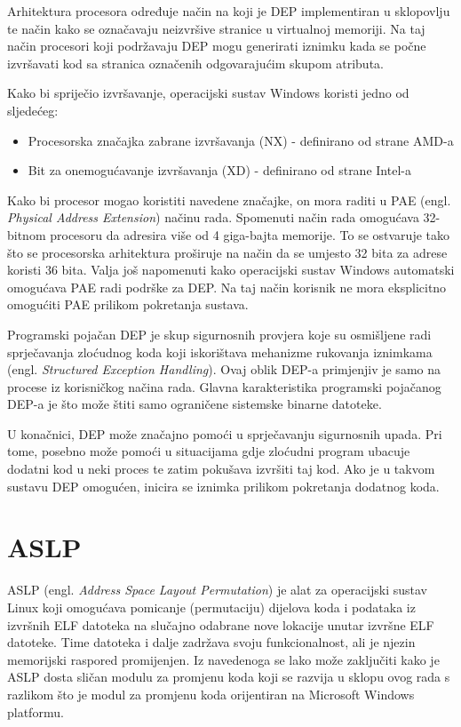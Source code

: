 \documentclass[times, utf8, diplomski, numeric]{fer}
\begin{document}
Arhitektura procesora određuje način na koji je DEP implementiran
u sklopovlju te način kako se označavaju neizvršive stranice u virtualnoj memoriji.
Na taj način procesori koji podržavaju DEP mogu generirati
iznimku kada se počne izvršavati kod sa stranica označenih
odgovarajućim skupom atributa.

Kako bi spriječio izvršavanje, operacijski sustav Windows koristi
jedno od sljedećeg:

\begin{itemize}
\item Procesorska značajka zabrane izvršavanja (NX) - definirano od strane AMD-a
\item Bit za onemogućavanje izvršavanja (XD) - definirano od strane Intel-a
\end{itemize}

Kako bi procesor mogao koristiti navedene značajke, on mora
raditi u PAE (engl. \emph{Physical Address
Extension}) \citep{pae_ms} načinu rada. Spomenuti način rada
omogućava 32-bitnom procesoru da adresira više od 4 giga-bajta
memorije. To se ostvaruje tako što se procesorska arhitektura
proširuje na način da se umjesto 32 bita za adrese koristi 36
bita. Valja još napomenuti kako operacijski sustav Windows
automatski omogućava PAE radi podrške za DEP. Na taj način korisnik
ne mora eksplicitno omogućiti PAE prilikom pokretanja sustava.

Programski pojačan DEP je skup sigurnosnih provjera koje su
osmišljene radi sprječavanja zloćudnog koda koji iskorištava
mehanizme rukovanja iznimkama (engl. \emph{Structured Exception
Handling}). Ovaj oblik DEP-a primjenjiv je samo na procese iz
korisničkog načina rada. Glavna karakteristika programski
pojačanog DEP-a je što može štiti samo ograničene sistemske
binarne datoteke.

U konačnici, DEP može značajno pomoći u sprječavanju sigurnosnih
upada. Pri tome, posebno može pomoći u situacijama gdje zloćudni
program ubacuje dodatni kod u neki proces te zatim pokušava
izvršiti taj kod. Ako je u takvom sustavu DEP omogućen, inicira
se iznimka prilikom pokretanja dodatnog koda.

\section{ASLP}
\label{sct:aslp}

ASLP \citep{aslp} (engl. \emph{Address Space Layout Permutation}) 
je alat za operacijski sustav Linux koji omogućava pomicanje 
(permutaciju) dijelova koda i podataka iz izvršnih ELF datoteka
na slučajno odabrane nove lokacije unutar izvršne ELF datoteke.
Time datoteka i dalje zadržava svoju funkcionalnost, ali je
njezin memorijski raspored promijenjen. Iz navedenoga se lako
može zaključiti kako je ASLP dosta sličan modulu za promjenu koda
koji se razvija u sklopu ovog rada s razlikom što je modul za
promjenu koda orijentiran na Microsoft Windows platformu. 
\end{document}
